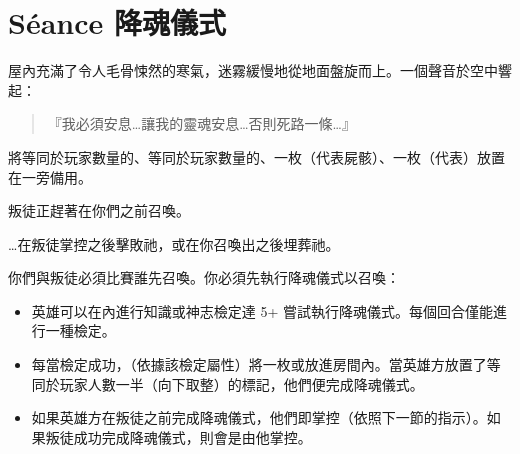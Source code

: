 
\chapter{Séance 降魂儀式}

\begin{HauntStory}
  屋內充滿了令人毛骨悚然的寒氣，迷霧緩慢地從地面盤旋而上。一個聲音於空中響起：
  \begin{quote}
    『我必須安息…讓我的靈魂安息…否則死路一條…』
  \end{quote}
\end{HauntStory}

將等同於玩家數量的、等同於玩家數量的、一枚（代表屍骸）、一枚（代表）放置在一旁備用。

叛徒正趕著在你們之前召喚。

…在叛徒掌控之後擊敗祂，或在你召喚出之後埋葬祂。

你們與叛徒必須比賽誰先召喚。你必須先執行降魂儀式以召喚：
\begin{itemize}
  \item 英雄可以在內進行知識或神志檢定達 5+ 嘗試執行降魂儀式。每個回合僅能進行一種檢定。
  \item 每當檢定成功，（依據該檢定屬性）將一枚或放進房間內。當英雄方放置了等同於玩家人數一半（向下取整）的標記，他們便完成降魂儀式。
  \item 如果英雄方在叛徒之前完成降魂儀式，他們即掌控（依照下一節的指示）。如果叛徒成功完成降魂儀式，則會是由他掌控。
\end{itemize}

\vfill\null\pagebreak

